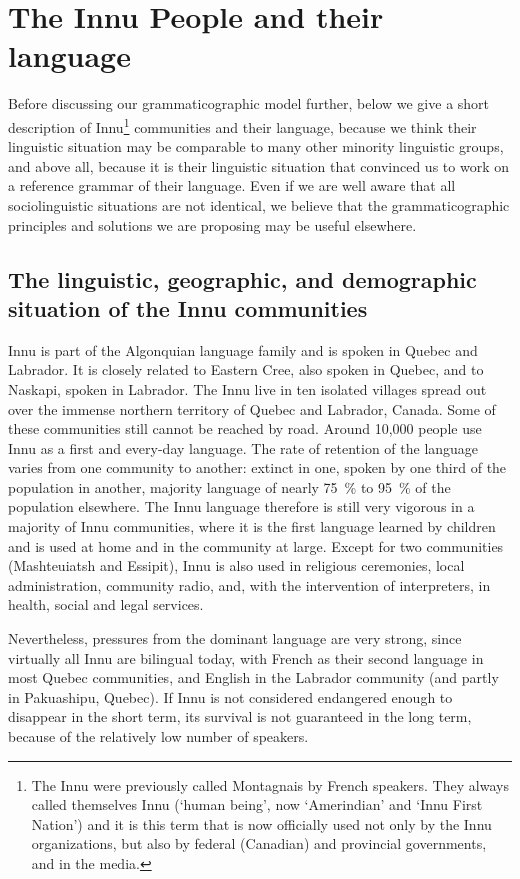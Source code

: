 \section{The Innu People and their language}
Before discussing our grammaticographic model further, below we give a short description of Innu\footnote{The
 Innu were previously called Montagnais by French speakers. They always called themselves Innu (`human being', now `Amerindian' and `Innu First Nation') and it is this term that is now officially used not only by the Innu organizations, but also by federal (Canadian) and provincial governments, and in the media.
} 
communities and their language, because we think their linguistic situation may be comparable to many other minority linguistic groups, and above all, because it is their linguistic situation that convinced us to work on a reference grammar of their language. Even if we are well aware that all sociolinguistic situations are not identical, we believe that the grammaticographic principles and solutions we are proposing may be useful elsewhere. 

\subsection{The linguistic, geographic, and demographic situation of the Innu communities} 
Innu is part of the Algonquian language family and is spoken in Quebec and Labrador. It is closely related to Eastern Cree, also spoken in Quebec, and to Naskapi, spoken in Labrador. The Innu live in ten isolated villages spread out over the immense northern territory of Quebec and Labrador, Canada. Some of these communities still cannot be reached by road. Around 10,000 people use Innu as a first and every-day language. The rate of retention of the language varies from one community to another: extinct in one, spoken by one third of the population in another, majority language of nearly 75~\% to 95~\% of the population elsewhere. The Innu language therefore is still very vigorous in a majority of Innu communities, where it is the first language learned by children and is used at home and in the community at large. Except for two communities (Mashteuiatsh and Essipit), Innu is also used in religious ceremonies, local administration, community radio, and, with the intervention of interpreters, in health, social and legal services.

Nevertheless, pressures from the dominant language are very strong, since virtually all Innu are bilingual today, with French as their second language in most Quebec communities, and English in the Labrador community (and partly in Pakuashipu, Quebec). If Innu is not considered endangered enough to disappear in the short term, its survival is not guaranteed in the long term, because of the relatively low number of speakers. 

